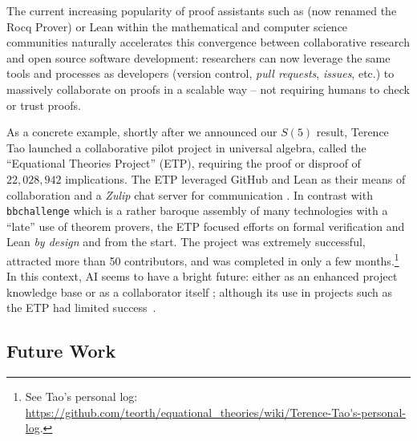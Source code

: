 \documentclass[a4paper,british]{article}
\theoremstyle{definition} %
\numberwithin{equation}{section}
\theoremstyle{definition} %
\begin{document}
The current increasing popularity of proof assistants such as \Coq (now renamed the Rocq Prover) or Lean within the mathematical and computer science communities naturally accelerates this convergence between collaborative research and open source software development: researchers can now leverage the same tools and processes as developers (version control, \textit{pull requests}, \textit{issues}, etc.) to massively collaborate on proofs in a scalable way -- \ie not requiring humans to check or trust proofs.

As a concrete example, shortly after we announced our $S(5)$ result, Terence Tao launched a collaborative pilot project in universal algebra, called the ``Equational Theories Project'' (ETP), requiring the proof or disproof of $22{,}028{,}942$ implications. The ETP leveraged GitHub and Lean as their means of collaboration and a \textit{Zulip} chat server for communication \cite{TaoBlog, swh-dir-426b52b, ETPpaper}. In contrast with \texttt{bbchallenge} which is a rather baroque assembly of many technologies with a ``late'' use of theorem provers, the ETP focused efforts on formal verification and Lean \textit{by design} and from the start. The project was extremely successful, attracted more than 50 contributors, and was completed in only a few months.\footnote{See Tao's personal log: \url{https://github.com/teorth/equational_theories/wiki/Terence-Tao's-personal-log}.} In this context, AI seems to have a bright future: either as an enhanced project knowledge base or as a collaborator itself \cite{Trinh2024, wu2024internlm25stepproveradvancingautomatedtheorem}; although its use in projects such as the ETP had limited success~\cite{ETPpaper}.


































\subsection{Future Work}\label{sec:fw}
\end{document}
